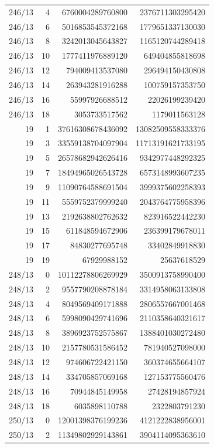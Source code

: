 \begin{longtable}{@{}rrrr@{}}
246/13 & 4 & 6760004289760800 & 2376711303295420\\
246/13 & 6 & 5016853545372168 & 1779651337130030\\
246/13 & 8 & 3242013045643827 & 1165120744289418\\
246/13 & 10 & 1777411976889120 & 649404855818698\\
246/13 & 12 & 794009413537080 & 296494150430808\\
246/13 & 14 & 263943281916288 & 100759157353750\\
246/13 & 16 & 55997926688512 & 22026199239420\\
246/13 & 18 & 3053733517562 & 1179011563128\\
19 & 1 & 37616308678436092 & 13082509558333376\\
19 & 3 & 33559138704097904 & 11713191621733195\\
19 & 5 & 26578682942626416 & 9342977448292325\\
19 & 7 & 18494965026543728 & 6573148993607235\\
19 & 9 & 11090764588691504 & 3999375602258393\\
19 & 11 & 5559752379999240 & 2043764775958396\\
19 & 13 & 2192638802762632 & 823916522442230\\
19 & 15 & 611848594672906 & 236399179678011\\
19 & 17 & 84830277695748 & 33402849918830\\
19 & 19 & 67929988152 & 25637618529\\
248/13 & 0 & 10112278806269929 & 3500913758990400\\
248/13 & 2 & 9557790208878184 & 3314958063133808\\
248/13 & 4 & 8049569409171888 & 2806557667001468\\
248/13 & 6 & 5998090429741696 & 2110358640321617\\
248/13 & 8 & 3896923752575867 & 1388401030272480\\
248/13 & 10 & 2157780531586452 & 781940527098000\\
248/13 & 12 & 974606722421150 & 360374655664107\\
248/13 & 14 & 334705857069168 & 127153775560476\\
248/13 & 16 & 70944845149958 & 27428194857924\\
248/13 & 18 & 6035898110788 & 2322803791230\\
250/13 & 0 & 12001398376199236 & 4121222838956001\\
250/13 & 2 & 11349802929143861 & 3904114095363610\\

\end{longtable}

